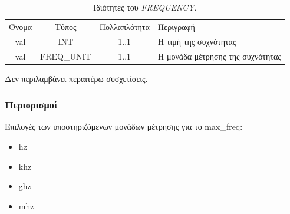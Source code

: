 \begin{table}[H]
	\begin{center}
		\begin{tabular}{ | c | c | c| m{5.5cm} | }
			\hline
			\rowcolor{Gray}
			\multicolumn{4}{|c|}{\textbf{Ιδιότητες}}\\
			\hline
			\rowcolor{Gray}
			Όνομα & Τύπος & Πολλαπλότητα & Περιγραφή \\
			\hline
			val & INT & 1..1 & Η τιμή της συχνότητας \\
			\hline
			val & FREQ\_UNIT & 1..1 & Η μονάδα μέτρησης της συχνότητας \\
			\hline
		\end{tabular}
		\caption{Ιδιότητες του \textit{FREQUENCY}.}
		\label{tab:frequency}
	\end{center}
\end{table}

\noindent Δεν περιλαμβάνει περαιτέρω συσχετίσεις.

\subsubsection*{Περιορισμοί}

\noindent Επιλογές των υποστηριζόμενων μονάδων μέτρησης για το max\_freq:

\begin{itemize}
	\item hz
	\item khz
	\item ghz
	\item mhz
\end{itemize}
